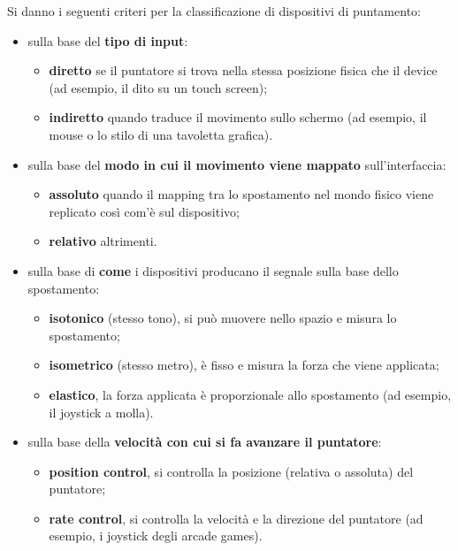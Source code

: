 Si danno i seguenti criteri per la classificazione di dispositivi di puntamento:
\begin{itemize}
	\itemsep-0.3em
	\item sulla base del \textbf{tipo di input}:
	\vspace{-3mm}
	\begin{itemize}
		\itemsep-0.3em
		\item \textbf{diretto} se il puntatore si trova nella stessa posizione fisica che il device (ad esempio, il dito su un touch screen);
		\item \textbf{indiretto} quando traduce il movimento sullo schermo (ad esempio, il mouse o lo stilo di una tavoletta grafica).
	\end{itemize}
	\item sulla base del \textbf{modo in cui il movimento viene mappato} sull'interfaccia:
	\vspace{-3mm}
	\begin{itemize}
		\itemsep-0.3em
		\item \textbf{assoluto} quando il mapping tra lo spostamento nel mondo fisico viene replicato così com'è sul dispositivo;
		\item \textbf{relativo} altrimenti.
	\end{itemize}
	\item sulla base di \textbf{come} i dispositivi producano il segnale sulla base dello spostamento:
	\vspace{-3mm}
	\begin{itemize}
		\itemsep-0.3em
		\item \textbf{isotonico} (stesso tono), si può muovere nello spazio e misura lo spostamento;
		\item \textbf{isometrico} (stesso metro), è fisso e misura la forza che viene applicata;
		\item \textbf{elastico}, la forza applicata è proporzionale allo spostamento (ad esempio, il joystick a molla).
	\end{itemize}
	\item sulla base della \textbf{velocità con cui si fa avanzare il puntatore}:
	\vspace{-3mm}
	\begin{itemize}
		\itemsep-0.3em
		\item \textbf{position control}, si controlla la posizione (relativa o assoluta) del puntatore;
		\item \textbf{rate control}, si controlla la velocità e la direzione del puntatore (ad esempio, i joystick degli arcade games).
	\end{itemize}
\end{itemize}